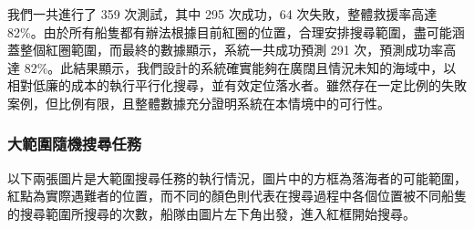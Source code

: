 \documentclass[12pt,a4paper]{article}
\begin{document}
我們一共進行了 359 次測試，其中 295  次成功，64  次失敗，整體救援率高達 82\%。由於所有船隻都有辦法根據目前紅圈的位置，合理安排搜尋範圍，盡可能涵蓋整個紅圈範圍，而最終的數據顯示，系統一共成功預測 291 次，預測成功率高達 82\%。此結果顯示，我們設計的系統確實能夠在廣闊且情況未知的海域中，以相對低廉的成本的執行平行化搜尋，並有效定位落水者。雖然存在一定比例的失敗案例，但比例有限，且整體數據充分證明系統在本情境中的可行性。

\newpage

\subsubsection{大範圍隨機搜尋任務}

以下兩張圖片是大範圍搜尋任務的執行情況，圖片中的方框為落海者的可能範圍，紅點為實際遇難者的位置，而不同的顏色則代表在搜尋過程中各個位置被不同船隻的搜尋範圍所搜尋的次數，船隊由圖片左下角出發，進入紅框開始搜尋。
\end{document}
